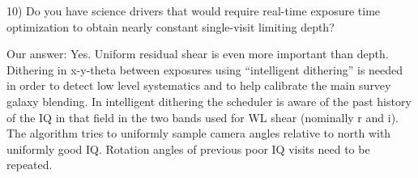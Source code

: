 10) Do you have science drivers that would require real-time exposure time optimization 
to obtain nearly constant single-visit limiting depth?

Our answer: Yes. Uniform residual shear is even more important than depth. Dithering in x-y-theta between exposures using “intelligent dithering” is needed in order to detect low level systematics and to help calibrate the main survey galaxy blending. In intelligent dithering the scheduler is aware of the past history of the IQ in that field in the two bands used for WL shear (nominally r and i). The algorithm tries to uniformly sample camera angles relative to north with uniformly good IQ. Rotation angles of previous poor IQ visits need to be repeated.


%
%
%
%
%
%
